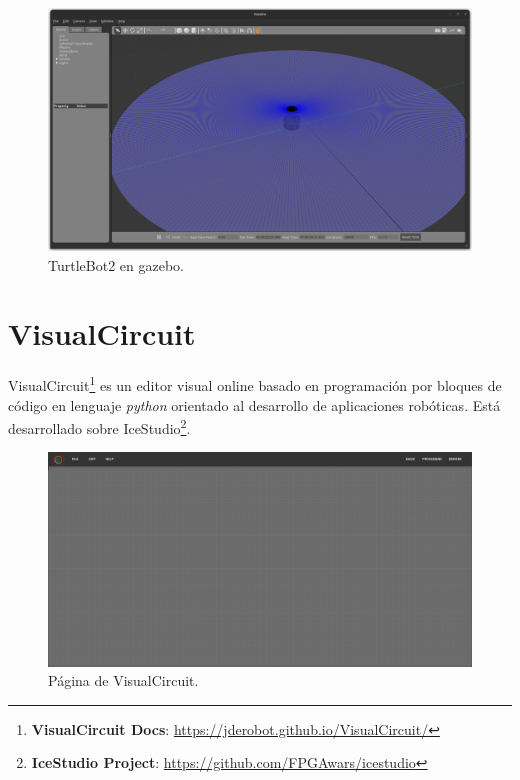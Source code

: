 \begin{figure} [H]
    \begin{center}
        \includegraphics[width=13cm]{figs/c3/turtlebot2_sim.png}
    \end{center}
    \caption[TurtleBot2 simulado]{TurtleBot2 en gazebo.}
    \label{fig:turtlebot_2_sim}
\end{figure}

\section{VisualCircuit}
\label{sec:visualcircuit}

VisualCircuit\footnote{\textbf{VisualCircuit Docs}: \url{https://jderobot.github.io/VisualCircuit/}} es un editor visual online basado en
programación por bloques de código en lenguaje \textit{python} orientado al desarrollo de aplicaciones robóticas.
Está desarrollado sobre IceStudio\footnote{\textbf{IceStudio Project}: \url{https://github.com/FPGAwars/icestudio}}.\\

\begin{figure} [H]
    \begin{center}
        \includegraphics[width=13cm]{figs/c3/empty_VC.png}
    \end{center}
    \caption[VisualCircuit]{Página de VisualCircuit.}
    \label{fig:VC_empty}
\end{figure}

